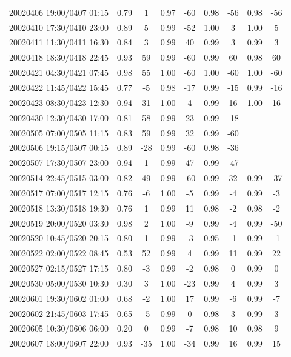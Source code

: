 \documentclass[draft]{agujournal2019}
\begin{document}
\begin{center}
\begin{longtable}{c||cc|cc|cc|cc}
20020406 19:00/0407 01:15 & 0.79 & 1 & 0.97 & -60 & 0.98 & -56 & 0.98 & -56 \\
20020410 17:30/0410 23:00 & 0.89 & 5 & 0.99 & -52 & 1.00 & 3 & 1.00 & 5 \\
20020411 11:30/0411 16:30 & 0.84 & 3 & 0.99 & 40 & 0.99 & 3 & 0.99 & 3 \\
20020418 18:30/0418 22:45 & 0.93 & 59 & 0.99 & -60 & 0.99 & 60 & 0.98 & 60 \\
20020421 04:30/0421 07:45 & 0.98 & 55 & 1.00 & -60 & 1.00 & -60 & 1.00 & -60 \\
20020422 11:45/0422 15:45 & 0.77 & -5 & 0.98 & -17 & 0.99 & -15 & 0.99 & -16 \\
20020423 08:30/0423 12:30 & 0.94 & 31 & 1.00 & 4 & 0.99 & 16 & 1.00 & 16 \\
20020430 12:30/0430 17:00 & 0.81 & 58 & 0.99 & 23 & 0.99 & -18 & & \\
20020505 07:00/0505 11:15 & 0.83 & 59 & 0.99 & 32 & 0.99 & -60 & & \\
20020506 19:15/0507 00:15 & 0.89 & -28 & 0.99 & -60 & 0.98 & -36 & & \\
20020507 17:30/0507 23:00 & 0.94 & 1 & 0.99 & 47 & 0.99 & -47 & & \\
20020514 22:45/0515 03:00 & 0.82 & 49 & 0.99 & -60 & 0.99 & 32 & 0.99 & -37 \\
20020517 07:00/0517 12:15 & 0.76 & -6 & 1.00 & -5 & 0.99 & -4 & 0.99 & -3 \\
20020518 13:30/0518 19:30 & 0.76 & 1 & 0.99 & 11 & 0.98 & -2 & 0.98 & -2 \\
20020519 20:00/0520 03:30 & 0.98 & 2 & 1.00 & -9 & 0.99 & -4 & 0.99 & -50 \\
20020520 10:45/0520 20:15 & 0.80 & 1 & 0.99 & -3 & 0.95 & -1 & 0.99 & -1 \\
20020522 02:00/0522 08:45 & 0.53 & 52 & 0.99 & 4 & 0.99 & 11 & 0.99 & 22 \\
20020527 02:15/0527 17:15 & 0.80 & -3 & 0.99 & -2 & 0.98 & 0 & 0.99 & 0 \\
20020530 05:00/0530 10:30 & 0.30 & 3 & 1.00 & -23 & 0.99 & 4 & 0.99 & 3 \\
20020601 19:30/0602 01:00 & 0.68 & -2 & 1.00 & 17 & 0.99 & -6 & 0.99 & -7 \\
20020602 21:45/0603 17:45 & 0.65 & -5 & 0.99 & 0 & 0.98 & 3 & 0.99 & 3 \\
20020605 10:30/0606 06:00 & 0.20 & 0 & 0.99 & -7 & 0.98 & 10 & 0.98 & 9 \\
20020607 18:00/0607 22:00 & 0.93 & -35 & 1.00 & -34 & 0.99 & 16 & 0.99 & 15 \\

\end{longtable}
\end{center}
\end{document}
